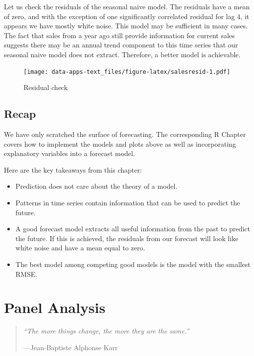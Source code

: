 \documentclass[
]{book}
\providecommand{\tightlist}{%
  \setlength{\itemsep}{0pt}\setlength{\parskip}{0pt}}
\begin{document}
Let us check the residuals of the seasonal naive model. The residuals have a mean of zero, and with the exception of one significantly correlated residual for lag 4, it appears we have mostly white noise. This model may be sufficient in many cases. The fact that sales from a year ago still provide information for current sales suggests there may be an annual trend component to this time series that our seasonal naive model does not extract. Therefore, a better model is achievable.

\begin{figure}
\centering
\texttt{[image: data-apps-text\_files/figure-latex/salesresid-1.pdf]}
\caption{\label{fig:salesresid}Residual check}
\end{figure}

\hypertarget{recap}{%
\section{Recap}\label{recap}}

We have only scratched the surface of forecasting. The corresponding R Chapter covers how to implement the models and plots above as well as incorporating explanatory variables into a forecast model.

Here are the key takeaways from this chapter:

\begin{itemize}
\tightlist
\item
  Prediction does not care about the theory of a model.
\item
  Patterns in time series contain information that can be used to predict the future.
\item
  A good forecast model extracts all useful information from the past to predict the future. If this is achieved, the residuals from our forecast will look like white noise and have a mean equal to zero.
\item
  The best model among competing good models is the model with the smallest RMSE.
\end{itemize}

\hypertarget{panel-analysis}{%
\chapter{Panel Analysis}\label{panel-analysis}}

\begin{quote}
\emph{``The more things change, the more they are the same.''}

---Jean-Baptiste Alphonse Karr
\end{quote}
\end{document}
